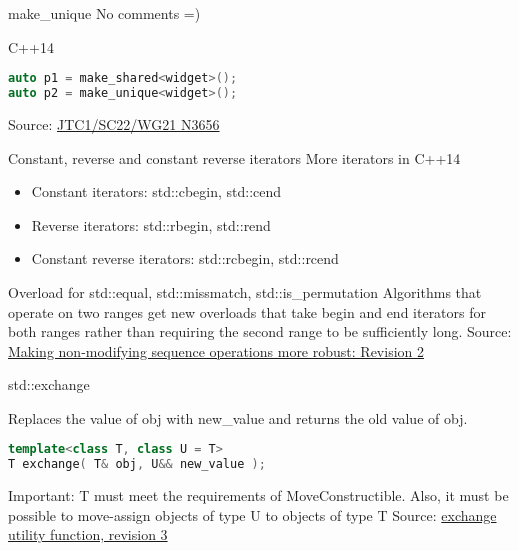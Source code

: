 \documentclass{beamer}
\begin{document}
\begin{frame}[fragile]{make\_unique}
No comments =)

\begin{block}{C++14}
\begin{lstlisting}[firstnumber=1, label=glabels, xleftmargin=5pt, language=C++] 
auto p1 = make_shared<widget>();
auto p2 = make_unique<widget>();
\end{lstlisting}
\end{block}

\vfill
Source: \href{http://www.open-std.org/jtc1/sc22/wg21/docs/papers/2013/n3656.htm}{JTC1/SC22/WG21 N3656}
\end{frame}

\begin{frame}{Constant, reverse and constant reverse iterators}
More iterators in C++14

\begin{itemize}
\item Constant iterators: std::cbegin, std::cend
\item Reverse iterators: std::rbegin, std::rend
\item Constant reverse iterators: std::rcbegin, std::rcend
\end{itemize}
\end{frame}

\begin{frame}{Overload for std::equal, std::missmatch, std::is\_permutation}
Algorithms that operate on two ranges get new overloads that take begin and end iterators for both ranges rather than requiring the second range to be sufficiently long.
\vfill
Source: \href{http://www.open-std.org/jtc1/sc22/wg21/docs/papers/2013/n3671.html}{Making non-modifying sequence operations more robust: Revision 2}
\end{frame}

\begin{frame}[fragile]{std::exchange}

Replaces the value of obj with new\_value and returns the old value of obj.

\begin{lstlisting}[firstnumber=1, label=glabels, xleftmargin=5pt, language=C++] 
template<class T, class U = T>
T exchange( T& obj, U&& new_value );
\end{lstlisting}
Important: T must meet the requirements of MoveConstructible. Also, it must be possible to move-assign objects of type U to objects of type T
\vfill
Source: \href{http://www.open-std.org/jtc1/sc22/wg21/docs/papers/2013/n3668.html}{exchange utility function, revision 3}
\end{frame}
\end{document}
